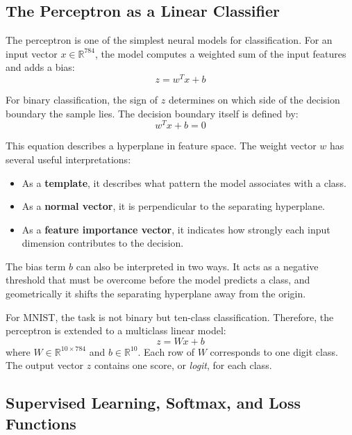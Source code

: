 \documentclass[11pt]{article}
\begin{document}
\subsection{The Perceptron as a Linear Classifier}

The perceptron is one of the simplest neural models for classification. For an input vector $x \in \mathbb{R}^{784}$, the model computes a weighted sum of the input features and adds a bias:
\begin{equation}
z = w^T x + b
\end{equation}

For binary classification, the sign of $z$ determines on which side of the decision boundary the sample lies. The decision boundary itself is defined by:
\begin{equation}
w^T x + b = 0
\end{equation}

This equation describes a hyperplane in feature space. The weight vector $w$ has several useful interpretations:
\begin{itemize}
    \item As a \textbf{template}, it describes what pattern the model associates with a class.
    \item As a \textbf{normal vector}, it is perpendicular to the separating hyperplane.
    \item As a \textbf{feature importance vector}, it indicates how strongly each input dimension contributes to the decision.
\end{itemize}

The bias term $b$ can also be interpreted in two ways. It acts as a negative threshold that must be overcome before the model predicts a class, and geometrically it shifts the separating hyperplane away from the origin.

For MNIST, the task is not binary but ten-class classification. Therefore, the perceptron is extended to a multiclass linear model:
\begin{equation}
z = Wx + b
\end{equation}
where $W \in \mathbb{R}^{10 \times 784}$ and $b \in \mathbb{R}^{10}$. Each row of $W$ corresponds to one digit class. The output vector $z$ contains one score, or \emph{logit}, for each class.

\subsection{Supervised Learning, Softmax, and Loss Functions}
\end{document}
